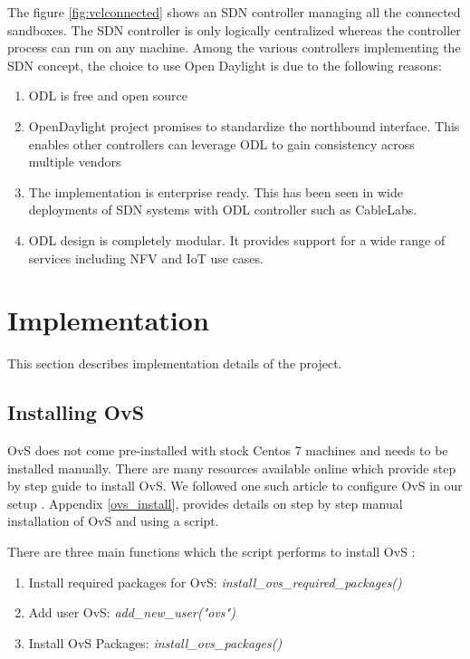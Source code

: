 \documentclass[12pt]{extarticle}
\begin{document}
The figure \ref{fig:vclconnected} shows an SDN controller managing all the connected sandboxes. The SDN controller is only logically centralized whereas the controller process can run on any machine. Among the various controllers implementing the SDN concept, the choice to use Open Daylight is due to the following reasons:
\begin{enumerate}
    \item ODL is free and open source
    \item OpenDaylight project promises to standardize the northbound interface. This enables other controllers can leverage ODL to gain consistency across multiple vendors
    \item The implementation is enterprise ready. This has been seen in wide deployments of SDN systems with ODL controller such as CableLabs.
    \item ODL design is completely modular. It provides support for a wide range of services including NFV and IoT use cases.
\end{enumerate}


\section{Implementation}

This section describes implementation details of the project. 

\subsection{Installing OvS} \label{master_install_ovs}

OvS does not come pre-installed with stock Centos 7 machines and needs to be installed manually. There are many resources available online which provide step by step guide to install OvS. We followed one such article to configure OvS in our setup \cite{ovsinstall}. Appendix \ref{ovs_install}, provides details on step by step manual installation of OvS and using a script.

\noindent
There are three main functions which the script performs to install OvS \cite{ovs_script}:

\begin{enumerate}
    \item Install required packages for OvS: \textit{install\_ovs\_required\_packages()}
    \item Add user OvS: \textit{add\_new\_user("ovs")}
    \item Install OvS Packages: \textit{install\_ovs\_packages()}
\end{enumerate}
\end{document}
